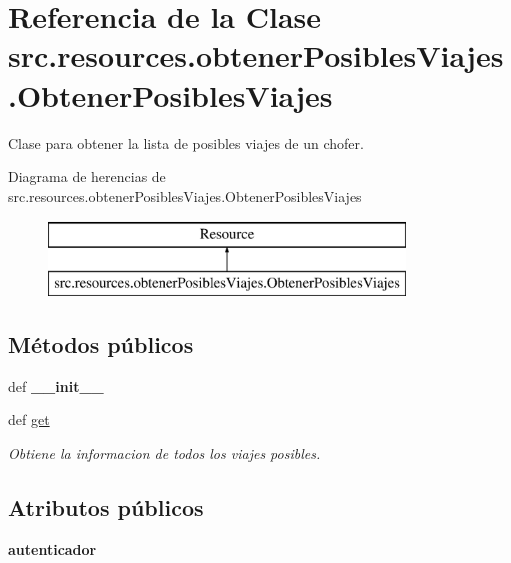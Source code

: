\hypertarget{classsrc_1_1resources_1_1obtener_posibles_viajes_1_1_obtener_posibles_viajes}{\section{Referencia de la Clase src.\-resources.\-obtener\-Posibles\-Viajes.\-Obtener\-Posibles\-Viajes}
\label{classsrc_1_1resources_1_1obtener_posibles_viajes_1_1_obtener_posibles_viajes}
}


Clase para obtener la lista de posibles viajes de un chofer.  


Diagrama de herencias de src.\-resources.\-obtener\-Posibles\-Viajes.\-Obtener\-Posibles\-Viajes\begin{figure}[H]
\begin{center}
\leavevmode
\includegraphics[height=2.000000cm]{classsrc_1_1resources_1_1obtener_posibles_viajes_1_1_obtener_posibles_viajes}
\end{center}
\end{figure}
\subsection*{Métodos públicos}
\begin{DoxyCompactItemize}
\item 
\hypertarget{classsrc_1_1resources_1_1obtener_posibles_viajes_1_1_obtener_posibles_viajes_ad93d3f991ef591efe6c5cef717b75967}{def {\bfseries \-\_\-\-\_\-init\-\_\-\-\_\-}}\label{classsrc_1_1resources_1_1obtener_posibles_viajes_1_1_obtener_posibles_viajes_ad93d3f991ef591efe6c5cef717b75967}

\item 
def \hyperlink{classsrc_1_1resources_1_1obtener_posibles_viajes_1_1_obtener_posibles_viajes_a987e5ab35e776e08efdd48277fc0f139}{get}
\begin{DoxyCompactList}\small\item\em Obtiene la informacion de todos los viajes posibles. \end{DoxyCompactList}\end{DoxyCompactItemize}
\subsection*{Atributos públicos}
\begin{DoxyCompactItemize}
\item 
\hypertarget{classsrc_1_1resources_1_1obtener_posibles_viajes_1_1_obtener_posibles_viajes_ab67410503478154e68e81ce1b95516b2}{{\bfseries autenticador}}\label{classsrc_1_1resources_1_1obtener_posibles_viajes_1_1_obtener_posibles_viajes_ab67410503478154e68e81ce1b95516b2}

\end{DoxyCompactItemize}
